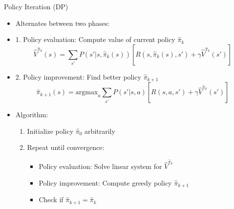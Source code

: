 \documentclass[10pt]{beamer}
\newcommand{\argmax}{\text{argmax}}
\begin{document}
\begin{frame}{Policy Iteration (DP)}
    \begin{itemize}
        \item Alternates between two phases:
        
        \item 1. Policy evaluation: Compute value of current policy $\hat{\pi}_k$
        \begin{equation}
            \hat{V}^{\hat{\pi}_k}(s) = \sum_{s'} P(s'|s,\hat{\pi}_k(s)) \left[ R(s,\hat{\pi}_k(s),s') + \gamma \hat{V}^{\hat{\pi}_k}(s') \right]
        \end{equation}
        
        \item 2. Policy improvement: Find better policy $\hat{\pi}_{k+1}$
        \begin{equation}
            \hat{\pi}_{k+1}(s) = \argmax_a \sum_{s'} P(s'|s,a) \left[ R(s,a,s') + \gamma \hat{V}^{\hat{\pi}_k}(s') \right]
        \end{equation}
        
        \item Algorithm:
        \begin{enumerate}
            \item Initialize policy $\hat{\pi}_0$ arbitrarily
            \item Repeat until convergence:
            \begin{itemize}
                \item Policy evaluation: Solve linear system for $\hat{V}^{\hat{\pi}_k}$
                \item Policy improvement: Compute greedy policy $\hat{\pi}_{k+1}$
                \item Check if $\hat{\pi}_{k+1} = \hat{\pi}_k$
            \end{itemize}
        \end{enumerate}
    \end{itemize}
\end{frame}
\end{document}
